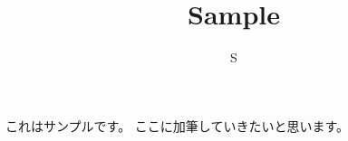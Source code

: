 \documentclass{article}
\title{Sample}
\author{S}
\begin{document}
\maketitle
これはサンプルです。
ここに加筆していきたいと思います。
\end{document}
